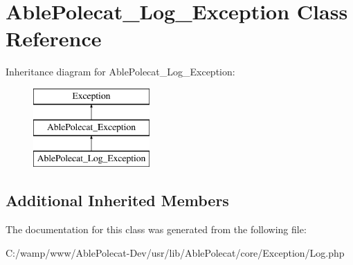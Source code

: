 \hypertarget{class_able_polecat___log___exception}{}\section{Able\+Polecat\+\_\+\+Log\+\_\+\+Exception Class Reference}
\label{class_able_polecat___log___exception}
Inheritance diagram for Able\+Polecat\+\_\+\+Log\+\_\+\+Exception\+:\begin{figure}[H]
\begin{center}
\leavevmode
\includegraphics[height=3.000000cm]{class_able_polecat___log___exception}
\end{center}
\end{figure}
\subsection*{Additional Inherited Members}


The documentation for this class was generated from the following file\+:\begin{DoxyCompactItemize}
\item 
C\+:/wamp/www/\+Able\+Polecat-\/\+Dev/usr/lib/\+Able\+Polecat/core/\+Exception/Log.\+php\end{DoxyCompactItemize}
